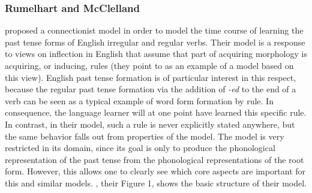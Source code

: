 \subsubsection{Rumelhart and McClelland}
\label{sec:rumel}


\citet{RumelhartandMcClelland:1986} proposed a connectionist model in order to model the time course
of learning the past tense forms of English irregular and regular
verbs.
Their model is a response to views on
inflection in English that assume that part of acquiring morphology is
acquiring, or inducing, rules (they point to \citealt{Pinker:1984} as
an example of a model based on this view). English past tense formation is of
particular interest in this respect, because the regular
past tense formation via the addition of \emph{-ed} to the end of a
verb can be seen as a typical example of word form formation by rule. In consequence, the language learner will at one point have
learned this specific rule. In contrast, in their model, such a rule
is never explicitly stated anywhere, but the same behavior falls out
from properties of the model. %
The model is
very restricted in its domain, since its goal is only to produce the
phonological representation of the past tense from the phonological
representations of the root form. However, this allows one to clearly
see which core aspects are important for this and similar
models. 
, their Figure 1, shows the basic structure of their model.

